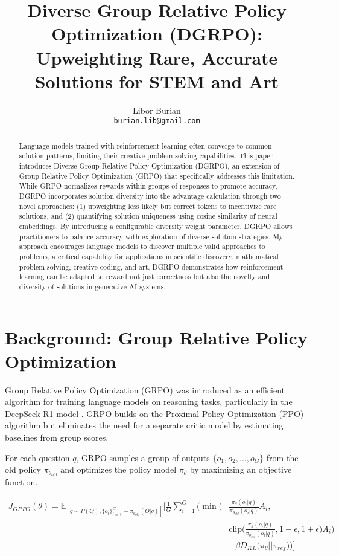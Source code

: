 \documentclass[10pt,twocolumn,letterpaper]{article}
\title{Diverse Group Relative Policy Optimization (DGRPO): Upweighting Rare, Accurate Solutions for STEM and Art}
\author{
  Libor Burian\\
  \texttt{burian.lib@gmail.com}\\
}
\begin{document}
\maketitle

\begin{abstract}
Language models trained with reinforcement learning often converge to common solution patterns, limiting their creative problem-solving capabilities. This paper introduces Diverse Group Relative Policy Optimization (DGRPO), an extension of Group Relative Policy Optimization (GRPO) that specifically addresses this limitation. While GRPO normalizes rewards within groups of responses to promote accuracy, DGRPO incorporates solution diversity into the advantage calculation through two novel approaches: (1) upweighting less likely but correct tokens to incentivize rare solutions, and (2) quantifying solution uniqueness using cosine similarity of neural embeddings. By introducing a configurable diversity weight parameter, DGRPO allows practitioners to balance accuracy with exploration of diverse solution strategies. My approach encourages language models to discover multiple valid approaches to problems, a critical capability for applications in scientific discovery, mathematical problem-solving, creative coding, and art. DGRPO demonstrates how reinforcement learning can be adapted to reward not just correctness but also the novelty and diversity of solutions in generative AI systems.
\end{abstract}

\section{Background: Group Relative Policy Optimization}
Group Relative Policy Optimization (GRPO) was introduced as an efficient algorithm for training language models on reasoning tasks, particularly in the DeepSeek-R1 model \citep{shao2024deepseek}. GRPO builds on the Proximal Policy Optimization (PPO) algorithm but eliminates the need for a separate critic model by estimating baselines from group scores.

For each question $q$, GRPO samples a group of outputs $\{o_1, o_2, \ldots, o_G\}$ from the old policy $\pi_{\theta_{old}}$ and optimizes the policy model $\pi_\theta$ by maximizing an objective function.

\begin{figure*}[t]
\begin{equation*}
\begin{split}
J_{GRPO}(\theta) = \mathbb{E}_{[q \sim P(Q), \{o_i\}_{i=1}^G \sim \pi_{\theta_{old}}(O|q)]} \Bigg[ \frac{1}{G} \sum_{i=1}^G \Bigg( 
\min \Bigg( & \frac{\pi_\theta(o_i|q)}{\pi_{\theta_{old}}(o_i|q)} A_i, \\
& \text{clip} \Bigg( \frac{\pi_\theta(o_i|q)}{\pi_{\theta_{old}}(o_i|q)}, 1-\epsilon, 1+\epsilon \Bigg) A_i \Bigg) \\
& - \beta D_{KL} \big( \pi_\theta || \pi_{ref} \big) \Bigg) \Bigg]
\end{split}
\end{equation*}
\label{eq:grpo}
\end{figure*}
\end{document}
